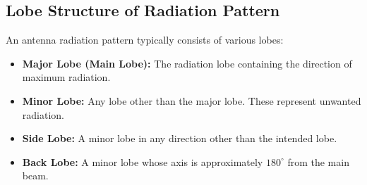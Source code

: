 \documentclass[12pt,a4paper]{article}
\begin{document}
\subsection{Lobe Structure of Radiation Pattern}
An antenna radiation pattern typically consists of various lobes:
\begin{itemize}[leftmargin=*, itemsep=3pt]
  \item \textbf{Major Lobe (Main Lobe):} The radiation lobe containing the direction of maximum radiation.
  \item \textbf{Minor Lobe:} Any lobe other than the major lobe. These represent unwanted radiation.
  \item \textbf{Side Lobe:} A minor lobe in any direction other than the intended lobe.
  \item \textbf{Back Lobe:} A minor lobe whose axis is approximately $180^\circ$ from the main beam.
\end{itemize}
\end{document}
